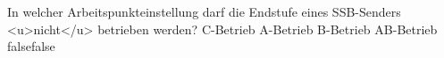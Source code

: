     {In welcher Arbeitspunkteinstellung darf die Endstufe eines SSB-Senders <u>nicht</u> betrieben werden?}
    {C-Betrieb}
    {A-Betrieb}
    {B-Betrieb}
    {AB-Betrieb}
    {false}{false}